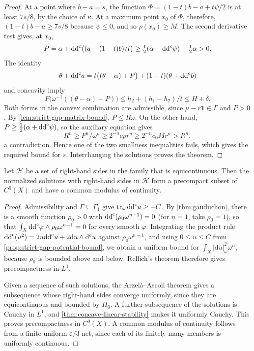 \begin{proof}
At a point where $b-a=s$, the function $\Phi=(1-t)b-a+t\psi/2$ is at least $7s/8$, by the choice of $\kappa$. At a maximum point $x_0$ of $\Phi$, therefore, $(1-t)b-a\geq7s/8$ because $\psi\leq0$, and so $\rho(x_0)\geq M$. The second derivative test gives, at $x_0$,
\[
 P=\alpha+\mathrm{dd}^{\mathrm{c}}\bigl((a-(1-t)b)/t\bigr)
 \geq\tfrac12(\alpha+\mathrm{dd}^{\mathrm{c}}\psi)+\tfrac12\alpha>0.
\]
The identity
\[
 \theta+\mathrm{dd}^{\mathrm{c}} a
 =t\bigl((\theta-\alpha)+P\bigr)+(1-t)(\theta+\mathrm{dd}^{\mathrm{c}} b)
\]
and concavity imply
\[
 F\bigl(\omega^{-1}((\theta-\alpha)+P)\bigr)
 \leq h_2+(h_1-h_2)/t\leq H+\delta.
\]
Both forms in the convex combination are admissible, since $\mu-r\mathbf1\in\Gamma$ and $P>0$. By \cref{lem:strict-gap-matrix-bound}, $P\leq R\omega$. On the other hand, $P\geq\frac12(\alpha+\mathrm{dd}^{\mathrm{c}}\psi)$, so the auxiliary equation gives
\[
 R^n\geq P^n/\omega^n
 \geq2^{-n}c\rho r^n\geq2^{-n}c_0Mr^n>R^n,
\]
a contradiction. Hence one of the two smallness inequalities fails, which gives the required bound for $s$. Interchanging the solutions proves the theorem.
\end{proof}

\begin{corollary}\label{cor:concave-uniform-compactness}
Let $\mathcal H$ be a set of right-hand sides in the family that is equicontinuous. Then the normalized solutions with right-hand sides in $\mathcal H$ form a precompact subset of $C^0(X)$ and have a common modulus of continuity.
\end{corollary}
\begin{proof}
Admissibility and $\Gamma\subseteq\Gamma_1$ give $\operatorname{tr}_\omega\mathrm{dd}^{\mathrm{c}} u\geq-C$. By \cref{thm:gauduchon}, there is a smooth function $\rho_0>0$ with $\mathrm{dd}^{\mathrm{c}}(\rho_0\omega^{n-1})=0$ (for $n=1$, take $\rho_0=1$), so that $\int_X\mathrm{dd}^{\mathrm{c}}\varphi\wedge\rho_0\omega^{n-1}=0$ for every smooth $\varphi$. Integrating the product rule $\mathrm{dd}^{\mathrm{c}}(u^2)=2u\mathrm{dd}^{\mathrm{c}} u+2\mathrm du\wedge\mathrm d^{\mathrm c} u$ against $\rho_0\omega^{n-1}$, and using $0\leq u\leq C$ from \cref{prop:strict-gap-potential-bound}, we obtain a uniform bound for $\int_X|\mathrm du|_\omega^2\omega^n$, because $\rho_0$ is bounded above and below. Rellich's theorem therefore gives precompactness in $L^1$.

Given a sequence of such solutions, the Arzel\`a--Ascoli theorem gives a subsequence whose right-hand sides converge uniformly, since they are equicontinuous and bounded by $H_0$. A further subsequence of the solutions is Cauchy in $L^1$, and \cref{thm:concave-linear-stability} makes it uniformly Cauchy. This proves precompactness in $C^0(X)$. A common modulus of continuity follows from a finite uniform $\varepsilon/3$-net, since each of its finitely many members is uniformly continuous.
\end{proof}
